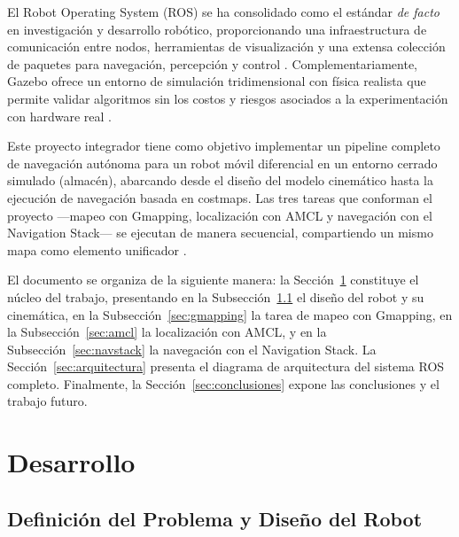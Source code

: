 \documentclass[12pt,letterpaper]{article}
\begin{document}
El Robot Operating System (ROS) se ha consolidado como el estándar \textit{de facto} en investigación y desarrollo robótico, proporcionando una infraestructura de comunicación entre nodos, herramientas de visualización y una extensa colección de paquetes para navegación, percepción y control \citep{quigley2009ros}. Complementariamente, Gazebo ofrece un entorno de simulación tridimensional con física realista que permite validar algoritmos sin los costos y riesgos asociados a la experimentación con hardware real \citep{koenig2004gazebo}.

Este proyecto integrador tiene como objetivo implementar un pipeline completo de navegación autónoma para un robot móvil diferencial en un entorno cerrado simulado (almacén), abarcando desde el diseño del modelo cinemático hasta la ejecución de navegación basada en costmaps. Las tres tareas que conforman el proyecto —mapeo con Gmapping, localización con AMCL y navegación con el Navigation Stack— se ejecutan de manera secuencial, compartiendo un mismo mapa como elemento unificador \citep{marder2010office}.

El documento se organiza de la siguiente manera: la Sección~\ref{sec:desarrollo} constituye el núcleo del trabajo, presentando en la Subsección~\ref{sec:diseno} el diseño del robot y su cinemática, en la Subsección~\ref{sec:gmapping} la tarea de mapeo con Gmapping, en la Subsección~\ref{sec:amcl} la localización con AMCL, y en la Subsección~\ref{sec:navstack} la navegación con el Navigation Stack. La Sección~\ref{sec:arquitectura} presenta el diagrama de arquitectura del sistema ROS completo. Finalmente, la Sección~\ref{sec:conclusiones} expone las conclusiones y el trabajo futuro.

\section{Desarrollo}
\label{sec:desarrollo}

\subsection{Definición del Problema y Diseño del Robot}
\label{sec:diseno}
\end{document}
